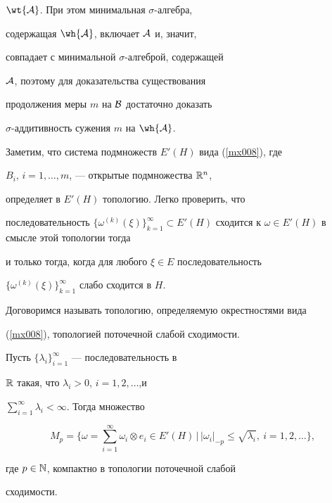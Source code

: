 $\wt{\cal{A}}$. При этом минимальная $\sigma$-алгебра,


содержащая $\wh{\cal{A}}$, включает $\cal{A}$ и, значит,


совпадает с минимальной $\sigma$-алгеброй, содержащей


$\cal{A}$, поэтому для доказательства существования


продолжения меры $m$ на $\cal{B}$ достаточно доказать


$\sigma$-аддитивность сужения $m$ на $\wh{\cal{A}}$.





Заметим, что система подмножеств $E'(H)$ вида (\ref{mx008}), где


$B_i$, $i=1,\dotsc,m$, --- открытые подмножества $\Bbb{R}^n$,


определяет в $E'(H)$ топологию. Легко проверить, что


последовательность $\{\omega^{(k)}(\xi)\}_{k=1}^{\infty}\subset


E'(H)$ сходится к $\omega\in E'(H)$ в смысле этой топологии тогда


и только тогда, когда для любого $\xi\in E$ последовательность


$\{\omega^{(k)}(\xi)\}_{k=1}^{\infty}$ слабо сходится в $H$.


Договоримся называть топологию, определяемую окрестностями вида


(\ref{mx008}), топологией поточечной слабой сходимости.








\begin{lem}


Пусть $\{\lambda_i\}_{i=1}^{\infty}$ --- последовательность в


$\Bbb{R}$ такая, что $\lambda_i>0$, $i=1,2,\dotsc$,\linebreak и


$\sum\limits_{i=1}^{\infty}\lambda_i<\infty$. Тогда множество


$$


M_p= \bigg\{\omega=\sum\limits_{i=1}^{\infty}\omega_i\otimes e_i\in


E'(H)\,\Big |\, |\omega_i|_{-p}\leq\sqrt{\lambda_i},\ i=1,2,\dotsc\bigg\},


$$


где $p\in\Bbb{N}$, компактно в топологии поточечной слабой


сходимости.


\end{lem}





